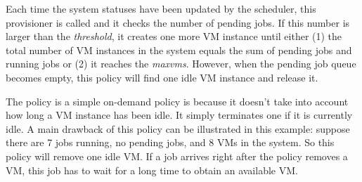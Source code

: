 Each time the system statuses have been updated by the scheduler, this
provisioner is called and it checks the number of pending jobs. If
this number is larger than the \emph{threshold}, it creates one more
VM instance until either (1) the total number of VM instances in the
system equals the sum of pending jobs and running jobs or (2) it reaches
the \emph{maxvms}. However, when the pending job queue becomes empty,
this policy will find one idle VM instance and release it.

The \policysimpleelastic{} policy is a simple on-demand policy is because
it doesn't take into account how long a VM instance has been idle. It simply
terminates one if it is currently idle. A main drawback of this policy
can be illustrated in this example: suppose there are 7 jobs running,
no pending jobs, and 8 VMs in the system. So this policy will remove
one idle VM. If a job arrives right after the policy removes a VM,
this job has to wait for a long time to obtain an available VM.
